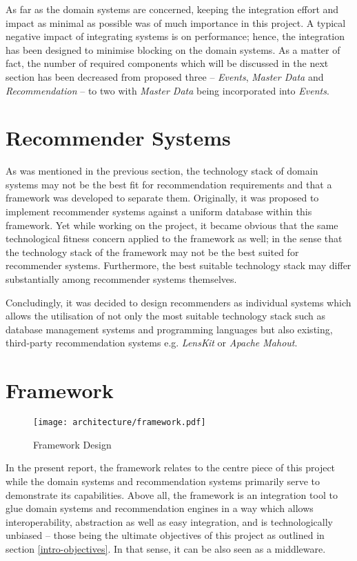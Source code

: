 As far as the domain systems are concerned, keeping the integration effort and impact as minimal as possible was of much importance in this project. A typical negative impact of integrating systems is on performance; hence, the integration has been designed to minimise blocking on the domain systems. As a matter of fact, the number of required components which will be discussed in the next section has been decreased from proposed three -- \emph{Events}, \emph{Master Data} and \emph{Recommendation} -- to two with \emph{Master Data} being incorporated into \emph{Events}.

\section{Recommender Systems}
\label{architecture-recommender-systems}

As was mentioned in the previous section, the technology stack of domain systems may not be the best fit for recommendation requirements and that a framework was developed to separate them. Originally, it was proposed to implement recommender systems against a uniform database within this framework. Yet while working on the project, it became obvious that the same technological fitness concern applied to the framework as well; in the sense that the technology stack of the framework may not be the best suited for recommender systems. Furthermore, the best suitable technology stack may differ substantially among recommender systems themselves.

Concludingly, it was decided to design recommenders as individual systems which allows the utilisation of not only the most suitable technology stack such as database management systems and programming languages but also existing, third-party recommendation systems e.g. \emph{LensKit} or \emph{Apache Mahout}.

\section{Framework}

\begin{figure}[ht]
    \texttt{[image: architecture/framework.pdf]}
    \caption{Framework Design}
    \label{fig:architecture-framework}
\end{figure}

In the present report, the framework relates to the centre piece of this project while the domain systems and recommendation systems primarily serve to demonstrate its capabilities. Above all, the framework is an integration tool to glue domain systems and recommendation engines in a way which allows interoperability, abstraction as well as easy integration, and is technologically unbiased -- those being the ultimate objectives of this project as outlined in section \ref{intro-objectives}. In that sense, it can be also seen as a middleware.

